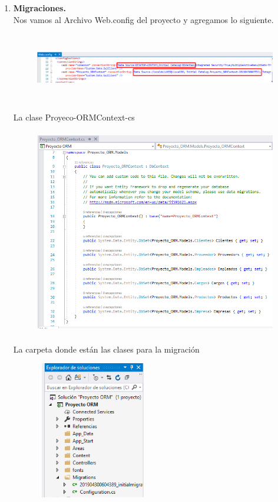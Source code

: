 \documentclass[12pt,a4paper,oneside]{book}
\begin{document}
\begin{enumerate}
\begin{enumerate}
\begin{enumerate}
						
				
					
						\item \textbf{Migraciones.} \\
						
							Nos vamos al Archivo Web.config del proyecto y agregamos lo siguiente.\\
								\begin{figure}[htb]
									\centering \includegraphics[width=12cm, height=3cm]{img/Migraciones/1webconfig.png}
								\end{figure}
				\newpage			
							La clase Proyeco-ORMContext-cs \\
								\begin{figure}[htb]
									\centering \includegraphics[width=12cm, height=9cm]{img/Migraciones/2Context.png}
								\end{figure}
							
							La carpeta donde est\'an las clases para la migraci\'on \\
								\begin{figure}[htb]
									\centering \includegraphics[width=5cm,height=6cm]{img/Migraciones/3clases.png}
								\end{figure}
					

\end{enumerate}
\end{enumerate}
\end{enumerate}
\end{document}
